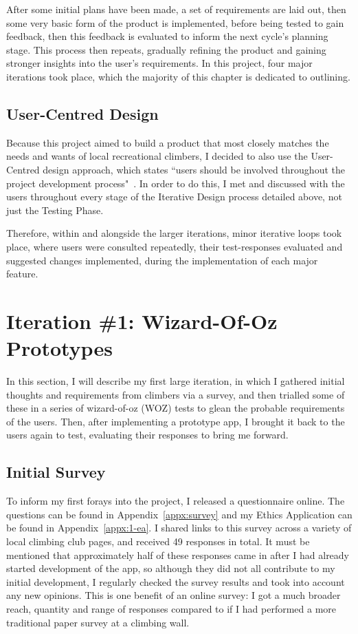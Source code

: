 After some initial plans have been made, a set of requirements are laid out, then some very basic form of the product is implemented, before being tested to gain feedback, then this feedback is evaluated to inform the next cycle's planning stage.
This process then repeats, gradually refining the product and gaining stronger insights into the user's requirements.
In this project, four major iterations took place, which the majority of this chapter is dedicated to outlining.


\subsection{User-Centred Design}
Because this project aimed to build a product that most closely matches the needs and wants of local recreational climbers, I decided to also use the User-Centred design approach, which states ``users should be involved throughout the project development
process"~\cite{ISO9241-210}.
In order to do this, I met and discussed with the users throughout every stage of the Iterative Design process detailed above, not just the Testing Phase.

Therefore, within and alongside the larger iterations, minor iterative loops took place, where users were consulted repeatedly, their test-responses evaluated and suggested changes implemented, during the implementation of each major feature.



\section{Iteration \#1: Wizard-Of-Oz Prototypes}
In this section, I will describe my first large iteration, in which I gathered initial thoughts and requirements from climbers via a survey, and then trialled some of these in a series of wizard-of-oz (WOZ) tests to glean the probable requirements of the users.
Then, after implementing a prototype app, I brought it back to the users again to test, evaluating their responses to bring me forward.


\subsection{Initial Survey}
To inform my first forays into the project, I released a questionnaire online.
The questions can be found in Appendix~\ref{appx:survey} and my Ethics Application can be found in Appendix~\ref{appx:1-ea}.
I shared links to this survey across a variety of local climbing club pages, and received 49 responses in total. 
It must be mentioned that approximately half of these responses came in after I had already started development of the app, so although they did not all contribute to my initial development, I regularly checked the survey results and took into account any new opinions.
This is one benefit of an online survey: I got a much broader reach, quantity and range of responses compared to if I had performed a more traditional paper survey at a climbing wall.


